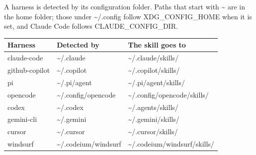 \documentclass[
  american,
  10pt,
]{report}
\newcounter{none} %
\renewcommand{\texttt}[1]{{\ttfamily\hyphenchar\font=-1 #1}}
\begin{document}
A harness is detected by its configuration folder. Paths that start with
\texttt{\textasciitilde{}} are in the home folder; those under
\texttt{\textasciitilde{}/\allowbreak{}.\allowbreak{}config} follow
\texttt{XDG\_\allowbreak{}CONFIG\_\allowbreak{}HOME} when it is set, and
Claude Code follows
\texttt{CLAUDE\_\allowbreak{}CONFIG\_\allowbreak{}DIR}.

{\def\LTcaptype{none} %
\begin{longtable}[]{@{}lll@{}}
\toprule\noalign{}
Harness & Detected by & The skill goes to \\
\midrule\noalign{}
\endhead
\bottomrule\noalign{}
\endlastfoot
\texttt{claude-\allowbreak{}code} &
\texttt{\textasciitilde{}/\allowbreak{}.\allowbreak{}claude} &
\texttt{\textasciitilde{}/\allowbreak{}.\allowbreak{}claude/\allowbreak{}skills/\allowbreak{}} \\
\texttt{github-\allowbreak{}copilot} &
\texttt{\textasciitilde{}/\allowbreak{}.\allowbreak{}copilot} &
\texttt{\textasciitilde{}/\allowbreak{}.\allowbreak{}copilot/\allowbreak{}skills/\allowbreak{}} \\
\texttt{pi} &
\texttt{\textasciitilde{}/\allowbreak{}.\allowbreak{}pi/\allowbreak{}agent}
&
\texttt{\textasciitilde{}/\allowbreak{}.\allowbreak{}pi/\allowbreak{}agent/\allowbreak{}skills/\allowbreak{}} \\
\texttt{opencode} &
\texttt{\textasciitilde{}/\allowbreak{}.\allowbreak{}config/\allowbreak{}opencode}
&
\texttt{\textasciitilde{}/\allowbreak{}.\allowbreak{}config/\allowbreak{}opencode/\allowbreak{}skills/\allowbreak{}} \\
\texttt{codex} &
\texttt{\textasciitilde{}/\allowbreak{}.\allowbreak{}codex} &
\texttt{\textasciitilde{}/\allowbreak{}.\allowbreak{}agents/\allowbreak{}skills/\allowbreak{}} \\
\texttt{gemini-\allowbreak{}cli} &
\texttt{\textasciitilde{}/\allowbreak{}.\allowbreak{}gemini} &
\texttt{\textasciitilde{}/\allowbreak{}.\allowbreak{}gemini/\allowbreak{}skills/\allowbreak{}} \\
\texttt{cursor} &
\texttt{\textasciitilde{}/\allowbreak{}.\allowbreak{}cursor} &
\texttt{\textasciitilde{}/\allowbreak{}.\allowbreak{}cursor/\allowbreak{}skills/\allowbreak{}} \\
\texttt{windsurf} &
\texttt{\textasciitilde{}/\allowbreak{}.\allowbreak{}codeium/\allowbreak{}windsurf}
&
\texttt{\textasciitilde{}/\allowbreak{}.\allowbreak{}codeium/\allowbreak{}windsurf/\allowbreak{}skills/\allowbreak{}} \\

\end{longtable}}
\end{document}

